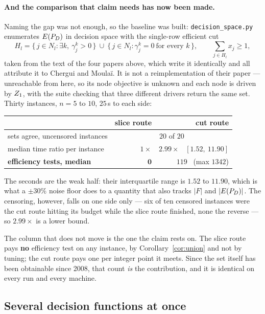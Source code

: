 \documentclass[11pt,a4paper]{article}
\begin{document}
\paragraph{And the comparison that claim needs has now been made.}
Naming the gap was not enough, so the baseline was built:
\texttt{decision\_space.py} enumerates $E(P_{D})$ in decision space with the
single-row efficient cut
\[
  H_l = \{\, j \in N_l : \exists k,\ \gamma^k_j > 0 \,\}
        \ \cup\
        \{\, j \in N_l : \gamma^k_j = 0 \ \text{for every } k \,\} ,
  \qquad \sum_{j \in H_l} x_j \geqslant 1 ,
\]
taken from the text of the four papers above, which write it identically and
all attribute it to Chergui and Moula\"i.  It is not a reimplementation of
their paper --- unreachable from here, so its node objective is unknown and
each node is driven by $Z_1$, with the suite checking that three different
drivers return the same set.  Thirty instances, $n = 5$ to $10$, $25$\,s to
each side:

\begin{center}
\begin{tabular}{lrr}
\toprule
 & slice route & cut route \\
\midrule
sets agree, uncensored instances  & \multicolumn{2}{c}{$20$ of $20$} \\
median time ratio per instance    & $1\times$ & $2.99\times$ \ $[1.52,\ 11.90]$ \\
\textbf{efficiency tests, median} & $\mathbf{0}$ & $119$ \ (max $1342$) \\
\bottomrule
\end{tabular}
\end{center}

\noindent
The seconds are the weak half: their interquartile range is $1.52$ to
$11.90$, which is what a $\pm 30\%$ noise floor does to a quantity that also
tracks $|F|$ and $|E(P_{D})|$.  The censoring, however, falls on one side only ---
six of ten censored instances were the cut route hitting its budget while the
slice route finished, none the reverse --- so $2.99\times$ is a lower bound.

The column that does not move is the one the claim rests on.  The slice route
pays \textbf{no} efficiency test on any instance, by
Corollary~\ref{cor:union} and not by tuning; the cut route pays one per
integer point it meets.  Since the set itself has been obtainable since 2008,
that count \emph{is} the contribution, and it is identical on every run and
every machine.

\subsection{Several decision functions at once}
\end{document}
